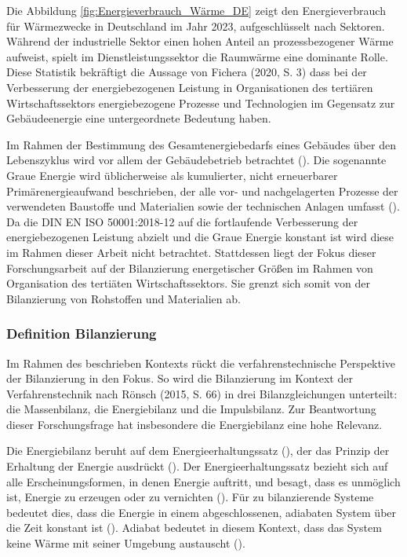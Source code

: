 Die Abbildung \ref{fig:Energieverbrauch_Wärme_DE} zeigt den Energieverbrauch für Wärmezwecke in Deutschland im Jahr 2023, aufgeschlüsselt nach Sektoren. 
Während der industrielle Sektor einen hohen Anteil an prozessbezogener Wärme aufweist, spielt im Dienstleistungssektor die Raumwärme 
eine dominante Rolle.
Diese Statistik bekräftigt die Aussage von Fichera (2020, S. 3) dass bei der Verbesserung der energiebezogenen Leistung in Organisationen des tertiären 
Wirtschaftssektors energiebezogene Prozesse und Technologien im Gegensatz zur Gebäudeenergie eine untergeordnete Bedeutung haben. 

Im Rahmen der Bestimmung des Gesamtenergiebedarfs eines Gebäudes über den Lebenszyklus wird vor allem der Gebäudebetrieb betrachtet (\cite[S. 133]{Musall.2015}).
Die sogenannte Graue Energie wird üblicherweise als kumulierter, nicht erneuerbarer Primärenergieaufwand beschrieben, der alle vor- und nachgelagerten 
Prozesse der verwendeten Baustoffe und Materialien sowie der technischen Anlagen umfasst (\cite[S. 133]{Musall.2015}). Da die DIN EN ISO 50001:2018-12 
auf die fortlaufende Verbesserung der energiebezogenen Leistung abzielt und die Graue Energie konstant ist wird diese im Rahmen dieser Arbeit nicht 
betrachtet. 
Stattdessen liegt der Fokus dieser Forschungsarbeit auf der Bilanzierung energetischer Größen im Rahmen von Organisation des tertiäten Wirtschaftssektors. 
Sie grenzt sich somit von der Bilanzierung von Rohstoffen und Materialien ab.


\subsubsection{Definition Bilanzierung}
Im Rahmen des beschrieben Kontexts rückt die verfahrenstechnische Perspektive der Bilanzierung in den Fokus. 
So wird die Bilanzierung im Kontext der Verfahrenstechnik nach Rönsch (2015, S. 66) in drei Bilanzgleichungen unterteilt: 
die Massenbilanz, die Energiebilanz und die Impulsbilanz. 
Zur Beantwortung dieser Forschungsfrage hat insbesondere die Energiebilanz eine hohe Relevanz.

Die Energiebilanz beruht auf dem Energieerhaltungssatz (\cite[S. 66]{Rönsch.2015}), der das Prinzip der Erhaltung 
der Energie ausdrückt (\cite[S. 57]{Baehr.1966}). Der Energieerhaltungssatz bezieht sich auf alle Erscheinungsformen, in denen Energie auftritt, 
und besagt, dass es unmöglich ist, Energie zu erzeugen oder zu vernichten (\cite[S. 57]{Baehr.1966}). 
Für zu bilanzierende Systeme bedeutet dies, dass die Energie in einem abgeschlossenen, adiabaten System über die Zeit 
konstant ist (\cite[S. 66]{Rönsch.2015}). 
Adiabat bedeutet in diesem Kontext, dass das System keine Wärme mit seiner Umgebung austauscht (\cite[S. 66]{Rönsch.2015}). 

